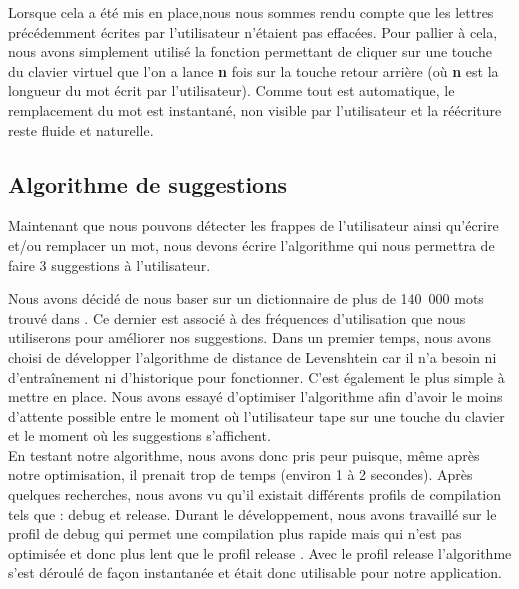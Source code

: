 \documentclass[a4paper, 11pt]{report}
\begin{document}
{Lorsque cela a été mis en place,nous nous sommes rendu compte que les lettres précédemment écrites par l'utilisateur n'étaient pas effacées. Pour pallier à cela, nous avons simplement utilisé la fonction permettant de cliquer sur une touche du clavier virtuel que l'on a lance \textbf{n} fois sur la touche retour arrière (où \textbf{n} est la longueur du mot écrit par l'utilisateur). Comme tout est automatique, le remplacement du mot est instantané, non visible par l'utilisateur et la réécriture reste fluide et naturelle.

\subsection{Algorithme de suggestions}

Maintenant que nous pouvons détecter les frappes de l'utilisateur ainsi qu'écrire et/ou remplacer un mot, nous devons écrire l'algorithme qui nous permettra de faire 3 suggestions à l'utilisateur.\par \vspace{\baselineskip}

Nous avons décidé de nous baser sur un dictionnaire de plus de 140~000 mots trouvé dans \cite{new2019lexique}. Ce dernier est associé à des fréquences d'utilisation que nous utiliserons pour améliorer nos suggestions. Dans un premier temps, nous avons choisi de développer l'algorithme de distance de Levenshtein car il n'a besoin ni d'entraînement ni d'historique pour fonctionner. C'est également le plus simple à mettre en place. Nous avons essayé d'optimiser l'algorithme afin d'avoir le moins d'attente possible entre le moment où l'utilisateur tape sur une touche du clavier et le moment où les suggestions s'affichent. \\

En testant notre algorithme, nous avons donc pris peur puisque, même après notre optimisation, il prenait trop de temps (environ 1 à 2 secondes). Après quelques recherches, nous avons vu qu'il existait  différents profils de compilation tels que : \og{}debug \fg{} et \og{}release\fg{}. Durant le développement, nous avons travaillé sur le profil de \og{}debug \fg{} qui permet une compilation plus rapide mais qui n'est pas optimisée et donc plus lent que le profil \og{}release \fg{}. Avec le profil \og{}release \fg{} l'algorithme s'est déroulé de façon instantanée et était donc utilisable pour notre application.\\

}
\end{document}
